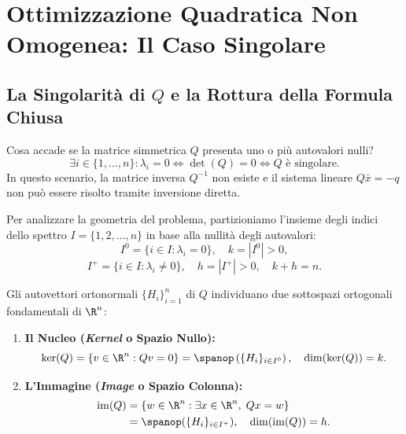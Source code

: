 \section{Ottimizzazione Quadratica Non Omogenea: Il Caso Singolare}
\label{sec:quadratica-non-omogenea-singolare}

\subsection{La Singolarit\`a di \texorpdfstring{$Q$}{Q} e la Rottura della Formula Chiusa}
Cosa accade se la matrice simmetrica $Q$ presenta uno o pi\`u autovalori nulli?
\begin{equation}
    \exists i \in \{1, \dots, n\} : \lambda_i = 0 \iff \det(Q) = 0 \iff Q \text{ \`e singolare}.
\end{equation}
In questo scenario, la matrice inversa $Q^{-1}$ non esiste e il sistema lineare $Q \bar{x} = -q$ non pu\`o essere risolto tramite inversione diretta.

Per analizzare la geometria del problema, partizioniamo l'insieme degli indici dello spettro $I = \{1, 2, \dots, n\}$ in base alla nullit\`a degli autovalori:
\begin{equation}
    I^0 = \{i \in I : \lambda_i = 0\}, \quad k = |I^0| > 0,
\end{equation}
\begin{equation}
    I^+ = \{i \in I : \lambda_i \neq 0\}, \quad h = |I^+| > 0, \quad k + h = n.
\end{equation}

Gli autovettori ortonormali $\{H_i\}_{i=1}^n$ di $Q$ individuano due sottospazi ortogonali fondamentali di $\R^n$:
\begin{enumerate}
    \item \textbf{Il Nucleo (\textit{Kernel} o Spazio Nullo):}
    \begin{equation}
        \ker(Q) = \{v \in \R^n : Qv = 0\} = \spanop\left(\{H_i\}_{i \in I^0}\right), \quad \dim(\ker(Q)) = k.
    \end{equation}
    \item \textbf{L'Immagine (\textit{Image} o Spazio Colonna):}
    \begin{align}
        \operatorname{im}(Q) &= \{w \in \R^n : \exists x \in \R^n, \; Qx = w\} \nonumber \\
        &= \spanop(\{H_i\}_{i \in I^+}), \quad \dim(\operatorname{im}(Q)) = h.
    \end{align}
\end{enumerate}

